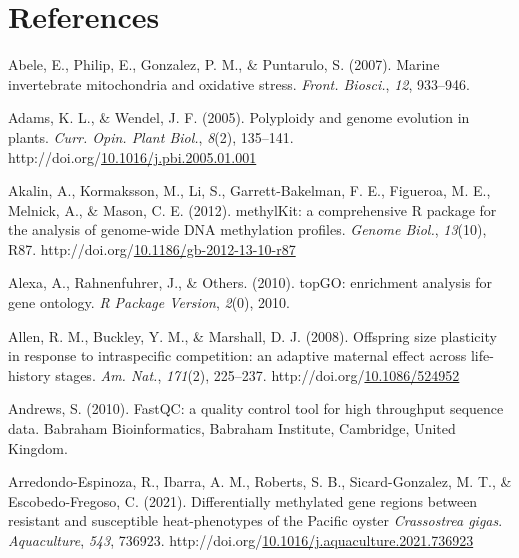 \documentclass [11pt, proquest] {uwthesis}[2015/03/03]
\newlength{\cslhangindent}
\newenvironment{CSLReferences}%
{\setlength{\parindent}{0pt}%
\everypar{\setlength{\hangindent}{\cslhangindent}}\ignorespaces}%
{\par}
\begin{document}
\hypertarget{references}{%
\chapter*{References}\label{references}}


\noindent

\setlength{\parindent}{-0.20in}
\setlength{\leftskip}{0.20in}
\setlength{\parskip}{8pt}

\hypertarget{refs}{}
\begin{CSLReferences}{1}{0}
\leavevmode\hypertarget{ref-Abele2007}{}%
Abele, E., Philip, E., Gonzalez, P. M., \& Puntarulo, S. (2007). {Marine invertebrate mitochondria and oxidative stress}. \emph{Front. Biosci.}, \emph{12}, 933--946.

\leavevmode\hypertarget{ref-Adams2005}{}%
Adams, K. L., \& Wendel, J. F. (2005). {Polyploidy and genome evolution in plants}. \emph{Curr. Opin. Plant Biol.}, \emph{8}(2), 135--141. http://doi.org/\href{https://doi.org/10.1016/j.pbi.2005.01.001}{10.1016/j.pbi.2005.01.001}

\leavevmode\hypertarget{ref-Akalin2012}{}%
Akalin, A., Kormaksson, M., Li, S., Garrett-Bakelman, F. E., Figueroa, M. E., Melnick, A., \& Mason, C. E. (2012). {methylKit: a comprehensive R package for the analysis of genome-wide DNA methylation profiles}. \emph{Genome Biol.}, \emph{13}(10), R87. http://doi.org/\href{https://doi.org/10.1186/gb-2012-13-10-r87}{10.1186/gb-2012-13-10-r87}

\leavevmode\hypertarget{ref-Alexa2010}{}%
Alexa, A., Rahnenfuhrer, J., \& Others. (2010). {topGO: enrichment analysis for gene ontology}. \emph{R Package Version}, \emph{2}(0), 2010.

\leavevmode\hypertarget{ref-Allen2008}{}%
Allen, R. M., Buckley, Y. M., \& Marshall, D. J. (2008). {Offspring size plasticity in response to intraspecific competition: an adaptive maternal effect across life-history stages}. \emph{Am. Nat.}, \emph{171}(2), 225--237. http://doi.org/\href{https://doi.org/10.1086/524952}{10.1086/524952}

\leavevmode\hypertarget{ref-Andrews2010}{}%
Andrews, S. (2010). {FastQC: a quality control tool for high throughput sequence data}. Babraham Bioinformatics, Babraham Institute, Cambridge, United Kingdom.

\leavevmode\hypertarget{ref-Arredondo-Espinoza2021}{}%
Arredondo-Espinoza, R., Ibarra, A. M., Roberts, S. B., Sicard-Gonzalez, M. T., \& Escobedo-Fregoso, C. (2021). {Differentially methylated gene regions between resistant and susceptible heat-phenotypes of the Pacific oyster \emph{Crassostrea gigas}}. \emph{Aquaculture}, \emph{543}, 736923. http://doi.org/\href{https://doi.org/10.1016/j.aquaculture.2021.736923}{10.1016/j.aquaculture.2021.736923}


\end{CSLReferences}
\end{document}
